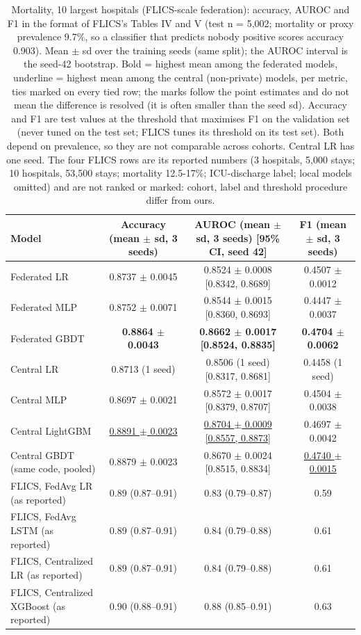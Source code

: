 \begin{table}[t]
\centering\small
\caption{Mortality, 10 largest hospitals (FLICS-scale federation): accuracy, AUROC and F1 in the format of FLICS's Tables IV and V (test n = 5,002; mortality or proxy prevalence 9.7\%, so a classifier that predicts nobody positive scores accuracy 0.903). Mean $\pm$ sd over the training seeds (same split); the AUROC interval is the seed-42 bootstrap. Bold = highest mean among the federated models, underline = highest mean among the central (non-private) models, per metric, ties marked on every tied row; the marks follow the point estimates and do not mean the difference is resolved (it is often smaller than the seed sd). Accuracy and F1 are test values at the threshold that maximises F1 on the validation set (never tuned on the test set; FLICS tunes its threshold on its test set). Both depend on prevalence, so they are not comparable across cohorts. Central LR has one seed. The four FLICS rows are its reported numbers (3 hospitals, 5,000 stays; 10 hospitals, 53,500 stays; mortality 12.5-17\%; ICU-discharge label; local models omitted) and are not ranked or marked: cohort, label and threshold procedure differ from ours.}\label{tab:final_top10}
\begin{tabular}{lccc}
\toprule
Model & Accuracy (mean $\pm$ sd, 3 seeds) & AUROC (mean $\pm$ sd, 3 seeds) [95\% CI, seed 42] & F1 (mean $\pm$ sd, 3 seeds) \\
\midrule
Federated LR & 0.8737 $\pm$ 0.0045 & 0.8524 $\pm$ 0.0008 [0.8342, 0.8689] & 0.4507 $\pm$ 0.0012 \\
Federated MLP & 0.8752 $\pm$ 0.0071 & 0.8544 $\pm$ 0.0015 [0.8360, 0.8693] & 0.4447 $\pm$ 0.0037 \\
Federated GBDT & \textbf{0.8864 $\pm$ 0.0043} & \textbf{0.8662 $\pm$ 0.0017 [0.8524, 0.8835]} & \textbf{0.4704 $\pm$ 0.0062} \\
Central LR & 0.8713 (1 seed) & 0.8506 (1 seed) [0.8317, 0.8681] & 0.4458 (1 seed) \\
Central MLP & 0.8697 $\pm$ 0.0021 & 0.8572 $\pm$ 0.0017 [0.8379, 0.8707] & 0.4504 $\pm$ 0.0038 \\
Central LightGBM & \underline{0.8891 $\pm$ 0.0023} & \underline{0.8704 $\pm$ 0.0009 [0.8557, 0.8873]} & 0.4697 $\pm$ 0.0042 \\
Central GBDT (same code, pooled) & 0.8879 $\pm$ 0.0023 & 0.8670 $\pm$ 0.0024 [0.8515, 0.8834] & \underline{0.4740 $\pm$ 0.0015} \\
FLICS, FedAvg LR (as reported) & 0.89 (0.87–0.91) & 0.83 (0.79–0.87) & 0.59 \\
FLICS, FedAvg LSTM (as reported) & 0.89 (0.87–0.91) & 0.84 (0.79–0.88) & 0.61 \\
FLICS, Centralized LR (as reported) & 0.89 (0.87–0.91) & 0.84 (0.79–0.88) & 0.61 \\
FLICS, Centralized XGBoost (as reported) & 0.90 (0.88–0.91) & 0.88 (0.85–0.91) & 0.63 \\
\bottomrule
\end{tabular}
\end{table}

